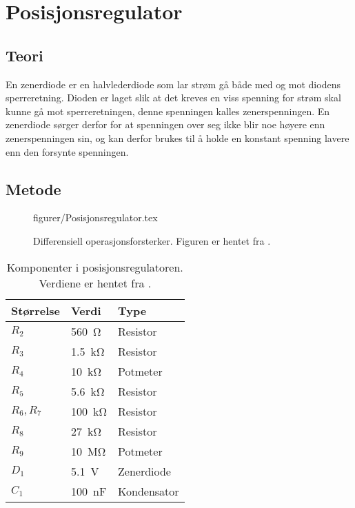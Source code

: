 \section{Posisjonsregulator}\label{sec:posisjonsregulator}

\subsection{Teori}


En zenerdiode er en halvlederdiode som lar strøm gå både med og mot diodens sperreretning. 
Dioden er laget slik at det kreves en viss spenning for strøm skal kunne gå mot sperreretningen, denne spenningen kalles zenerspenningen.
En zenerdiode sørger derfor for at spenningen over seg ikke blir noe høyere enn zenerspenningen sin, og kan derfor brukes til å holde en konstant spenning lavere enn den forsynte spenningen.





\subsection{Metode}

\begin{figure} [h]
    \centering
     {figurer/Posisjonsregulator.tex}
    \caption{Differensiell operasjonsforsterker. Figuren er hentet fra \cite{AnalogMotorlabbOppgaver}.}
    \label{fig:Posisjonsregulator}
\end{figure}

\begin{table}[h]
    \centering
    \caption{Komponenter i posisjonsregulatoren. Verdiene er hentet fra \cite{AnalogMotorlabbOppgaver}.}
    \begin{tabular}{lll}
        \toprule
		Størrelse & Verdi & Type \\
		\midrule
        $R_2$ & \SI{560}{\ohm} & Resistor \\
        $R_3$ & \SI{1.5}{\kilo\ohm} & Resistor\\
        $R_4$ & \SI{10}{\kilo\ohm} & Potmeter\\
        $R_5$ & \SI{5.6}{\kilo\ohm} & Resistor\\
        $R_6, R_7$ & \SI{100}{\kilo\ohm} & Resistor\\
        $R_8$ & \SI{27}{\kilo\ohm} & Resistor\\
        $R_9$ & \SI{10}{\mega\ohm} & Potmeter\\
        $D_1$ & \SI{5.1}{\volt} & Zenerdiode\\
        $C_1$ & \SI{100}{\nano\farad} & Kondensator\\
		\bottomrule
    \end{tabular}
    \label{tab:Posisjonsregulator}
\end{table}

